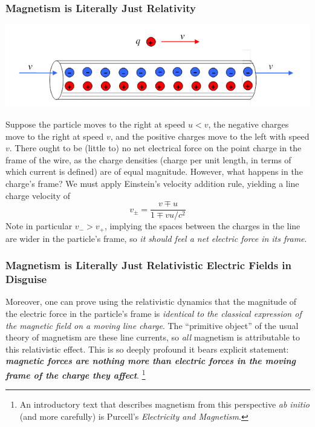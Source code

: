 \documentclass[10pt]{beamer}
\begin{document}
\begin{frame}
  \frametitle{Magnetism is Literally Just Relativity}
  \begin{center}
    \includegraphics[scale=0.5]{charge.png}
  \end{center}
  Suppose the particle moves to the right at speed $u<v$, the negative charges move to the right at speed $v$, and the positive charges move to the left with speed $v$.
  There ought to be (little to) no net electrical force on the point charge in the frame of the wire, as the charge densities (charge per unit length, in terms of which current is defined) are of equal magnitude.
  However, what happens in the charge's frame?
  We must apply Einstein's velocity addition rule, yielding a line charge velocity of
  \[
    v_{\pm}=\frac{v\mp u}{1\mp vu/c^{2}}
  \]
  Note in particular $v_{-}>v_{+}$, implying the spaces between the charges in the line are wider in the particle's frame, so \textit{it should feel a net electric force in its frame}.

\end{frame}

\begin{frame}
  \frametitle{Magnetism is Literally Just Relativistic Electric Fields in Disguise}
  Moreover, one can prove using the relativistic dynamics that the magnitude of the electric force in the particle's frame is \textit{identical to the classical expression of the magnetic field on a moving line charge}.
  The ``primitive object'' of the usual theory of magnetism are these line currents, so \textit{all} magnetism is attributable to this relativistic effect.
  This is so deeply profound it bears explicit statement: \textbf{\textit{magnetic forces are nothing more than electric forces in the moving frame of the charge they affect}}.
  \footnote{An introductory text that describes magnetism from this perspective \textit{ab initio} (and more carefully) is Purcell's \textit{Electricity and Magnetism}.}
\end{frame}
\end{document}

